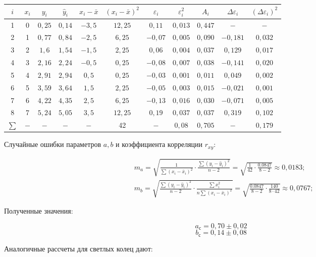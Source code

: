 \documentclass[a4paper, 12pt]{article}%
\begin{document}
\begin{tabular}{|c|c|c||c|c|c|c|c|c|c|c|}
\hline$i$ & $x_{i}$ & $y_{i}$ & $\hat{y}_{i}$ & $x_{i}-\bar{x}$ & $\left(x_{i}-\bar{x}\right)^{2}$ & $\varepsilon_{i}$ & $\varepsilon_{i}^{2}$ & $A_{i}$ & $\Delta \varepsilon_{i}$ & $\left(\Delta \varepsilon_{i}\right)^{2}$ \\
\hline 1 & 0 & $0,25$ & $0,14$ & $-3,5$ & $12,25$ & $0,11$ & $0,013$ & $0,447$ & $-$ & $-$ \\
\hline 2 & 1 & $0,77$ & $0,84$ & $-2,5$ & $6,25$ & $-0,07$ & $0,005$ & $0,090$ & $-0,181$ & $0,032$ \\
\hline 3 & 2 & $1,6$ & $1,54$ & $-1,5$ & $2,25$ & $0,06$ & $0,004$ & $0,037$ & $0,129$ & $0,017$ \\
\hline 4 & 3 & $2,16$ & $2,24$ & $-0,5$ & $0,25$ & $-0,08$ & $0,007$ & $0,038$ & $-0,141$ & $0,020$ \\
\hline 5 & 4 & $2,91$ & $2,94$ & $0,5$ & $0,25$ & $-0,03$ & $0,001$ & $0,011$ & $0,049$ & $0,002$ \\
\hline 6 & 5 & $3,59$ & $3,64$ & $1,5$ & $2,25$ & $-0,05$ & $0,003$ & $0,015$ & $-0,021$ & $0,001$ \\
\hline 7 & 6 & $4,22$ & $4,35$ & $2,5$ & $6,25$ & $-0,13$ & $0,016$ & $0,030$ & $-0,071$ & $0,005$ \\
\hline 8 & 7 & $5,24$ & $5,05$ & $3,5$ & $12,25$ & $0,19$ & $0,037$ & $0,037$ & $0,319$ & $0,102$ \\
\hline$\sum$ & $-$ & $-$ & $-$ & $-$ & 42 & $-$ & $0,08$ & $0,705$ & $-$ & $0,179$ \\
\hline
\end{tabular}


Случайные ошибки параметров $a, b$ и коэффициента корреляции $r_{x y}$:

$$
\begin{aligned}
&m_{a}=\sqrt{\frac{1}{\sum\left(x_{i}-\bar{x}_{i}\right)^{2}} \cdot \frac{\sum\left(y_{i}-\hat{y}_{i}\right)^{2}}{n-2}}=\sqrt{\frac{1}{42} \cdot \frac{0.0847}{8-2}} \approx 0,0183 ; \\
&m_{b}=\sqrt{\frac{\sum\left(y_{i}-\hat{y}_{i}\right)^{2}}{n-2} \cdot \frac{\sum x_{i}^{2}}{n \sum\left(x_{i}-\bar{x}_{i}\right)^{2}}}=\sqrt{\frac{0.0847}{8-2} \cdot \frac{140}{8 \cdot 42}} \approx 0,0767 ;
\end{aligned}
$$
	
Полученные значения:

\[ a_{\text{с}} = 0,70 \pm 0,02  \]
\[ b_{\text{с}} = 0,14 \pm 0,08  \]

Аналогичные рассчеты для светлых колец дают:
\end{document}
